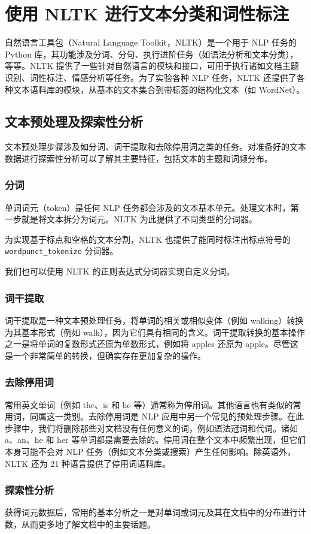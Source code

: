 \chapter{使用 NLTK 进行文本分类和词性标注\label{ch02}}

自然语言工具包（Natural Language Toolkit，NLTK）是一个用于 NLP 任务的 Python 库，其功能涉及分词、分句、执行进阶任务（如语法分析和文本分类），等等。NLTK 提供了一些针对自然语言的模块和接口，可用于执行诸如文档主题识别、词性标注、情感分析等任务。为了实验各种 NLP 任务，NLTK 还提供了各种文本语料库的模块，从基本的文本集合到带标签的结构化文本（如 WordNet）。
\section{文本预处理及探索性分析}
文本预处理步骤涉及如分词、词干提取和去除停用词之类的任务。对准备好的文本数据进行探索性分析可以了解其主要特征，包括文本的主题和词频分布。
\subsection{分词}
单词词元（token）是任何 NLP 任务都会涉及的文本基本单元。处理文本时，第一步就是将文本拆分为词元。NLTK 为此提供了不同类型的分词器。

为实现基于标点和空格的文本分割，NLTK 也提供了能同时标注出标点符号的 \verb|wordpunct_tokenize| 分词器。

我们也可以使用 NLTK 的正则表达式分词器实现自定义分词。
\subsection{词干提取}
词干提取是一种文本预处理任务，将单词的相关或相似变体（例如 walking）转换为其基本形式（例如 walk），因为它们具有相同的含义。词干提取转换的基本操作之一是将单词的复数形式还原为单数形式，例如将 apples 还原为 apple。尽管这是一个非常简单的转换，但确实存在更加复杂的操作。
\subsection{去除停用词}
常用英文单词（例如 the、is 和 he 等）通常称为停用词。其他语言也有类似的常用词，同属这一类别。去除停用词是 NLP 应用中另一个常见的预处理步骤。在此步骤中，我们将删除那些对文档没有任何意义的词，例如语法冠词和代词。诸如 a、an、he 和 her 等单词都是需要去除的。停用词在整个文本中频繁出现，但它们本身可能不会对 NLP 任务（例如文本分类或搜索）产生任何影响。除英语外，NLTK 还为 21 种语言提供了停用词语料库。
\subsection{探索性分析}
获得词元数据后，常用的基本分析之一是对单词或词元及其在文档中的分布进行计数，从而更多地了解文档中的主要话题。


